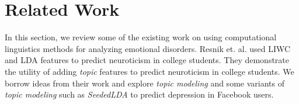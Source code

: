 \section{Related Work}
\label{sec:relatedwork}

In this section, we review some of the existing work on using computational linguistics methods for analyzing emotional disorders. Resnik et. al. \cite{ResnikGR13} used LIWC and LDA features to predict neuroticism in college students.  They demonstrate the utility of adding \textit{topic} features to predict neuroticism in college students. We borrow ideas from their work and explore \textit{topic modeling} and some variants of \textit{topic modeling} such as \textit{SeededLDA} to predict depression in Facebook users.

